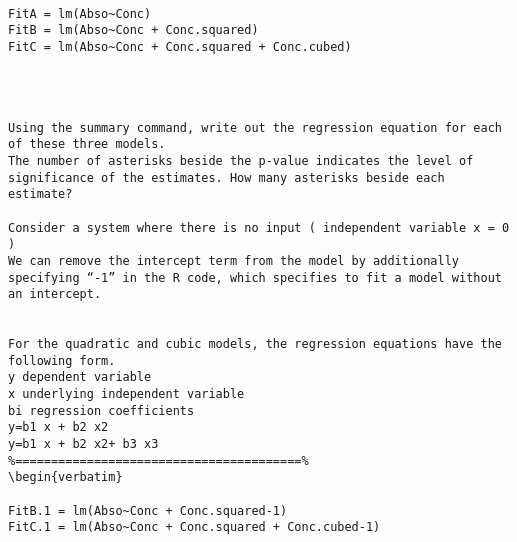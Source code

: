 \begin{verbatim}

FitA = lm(Abso~Conc)
FitB = lm(Abso~Conc + Conc.squared)
FitC = lm(Abso~Conc + Conc.squared + Conc.cubed)
\end{verbatim}
\begin{verbatim}



Using the summary command, write out the regression equation for each of these three models.
The number of asterisks beside the p-value indicates the level of significance of the estimates. How many asterisks beside each estimate?

Consider a system where there is no input ( independent variable x = 0 )  
We can remove the intercept term from the model by additionally specifying “-1” in the R code, which specifies to fit a model without an intercept. 


For the quadratic and cubic models, the regression equations have the following form.
y dependent variable
x underlying independent variable  
bi regression coefficients 
y=b1 x + b2 x2
y=b1 x + b2 x2+ b3 x3
%========================================%
\begin{verbatim}

FitB.1 = lm(Abso~Conc + Conc.squared-1)
FitC.1 = lm(Abso~Conc + Conc.squared + Conc.cubed-1)
\end{verbatim}












